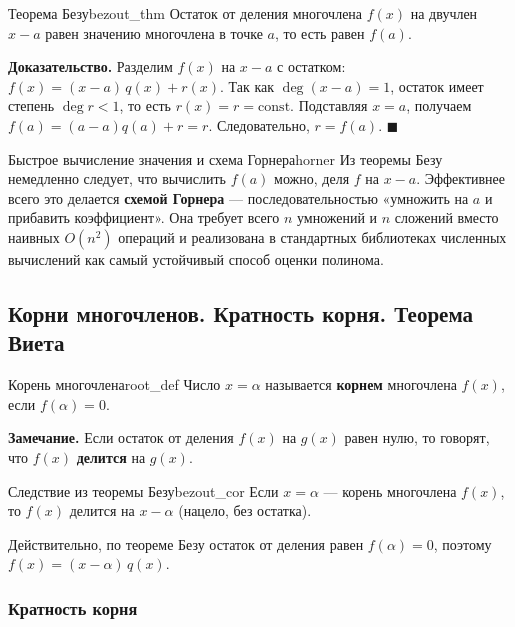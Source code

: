 \documentclass[12pt,a4paper]{article}
\newenvironment{myproof}{\noindent\textbf{Доказательство.}}{\hfill$\blacksquare$}
\begin{document}
\begin{theorem}{Теорема Безу}{bezout_thm}
Остаток от деления многочлена $f(x)$ на двучлен $x - a$ равен
значению многочлена в точке $a$, то есть равен $f(a)$.
\end{theorem}

\begin{myproof}
Разделим $f(x)$ на $x - a$ с остатком:
$f(x) = (x - a)\, q(x) + r(x)$. Так как $\deg(x - a) = 1$, остаток
имеет степень $\deg r < 1$, то есть $r(x) = r = \mathrm{const}$.
Подставляя $x = a$, получаем
$f(a) = (a - a) q(a) + r = r$. Следовательно, $r = f(a)$.
\end{myproof}

\begin{remarkIT}{Быстрое вычисление значения и схема Горнера}{horner}
Из теоремы Безу немедленно следует, что вычислить $f(a)$ можно,
деля $f$ на $x - a$. Эффективнее всего это делается \textbf{схемой
Горнера} — последовательностью «умножить на $a$ и прибавить
коэффициент». Она требует всего $n$ умножений и $n$ сложений вместо
наивных $O(n^2)$ операций и реализована в стандартных библиотеках
численных вычислений как самый устойчивый способ оценки полинома.
\end{remarkIT}

\subsection*{Корни многочленов. Кратность корня. Теорема Виета}

\begin{definition}{Корень многочлена}{root_def}
Число $x = \alpha$ называется \textbf{корнем} многочлена $f(x)$,
если $f(\alpha) = 0$.
\end{definition}

\noindent\textbf{Замечание.} Если остаток от деления $f(x)$ на $g(x)$
равен нулю, то говорят, что $f(x)$ \textbf{делится} на $g(x)$.

\begin{theorem}{Следствие из теоремы Безу}{bezout_cor}
Если $x = \alpha$ — корень многочлена $f(x)$, то $f(x)$ делится на
$x - \alpha$ (нацело, без остатка).
\end{theorem}

\noindent Действительно, по теореме Безу остаток от деления равен
$f(\alpha) = 0$, поэтому $f(x) = (x - \alpha)\, q(x)$.

\subsubsection*{Кратность корня}
\end{document}
